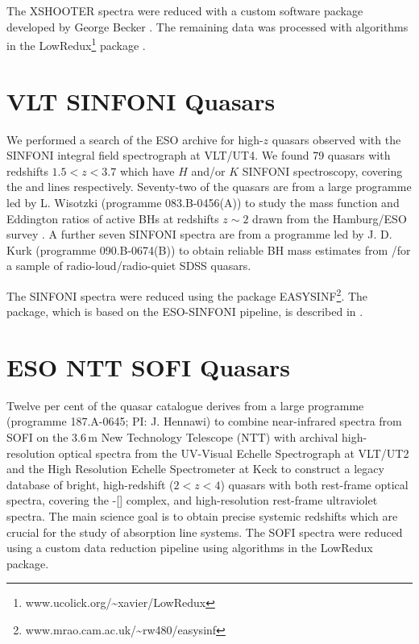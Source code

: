 The  XSHOOTER  spectra  were  reduced  with  a  custom  software  package  developed  by  George  Becker \citep[for details, see][]{lau15}. 
The remaining data was processed with algorithms in the LowRedux\footnote{www.ucolick.org/\textasciitilde xavier/LowRedux} package \citep[see][]{prochaska09}.

\section{VLT SINFONI Quasars}

We performed a search of the ESO archive for high-$z$ quasars observed with the SINFONI  integral  field  spectrograph \citep{eisenhauer03,bonnet04} at VLT/UT4.
We found 79 quasars with redshifts $1.5 < z < 3.7$ which have $H$ and/or $K$ SINFONI spectroscopy, covering the \hb and \ha lines respectively. 
Seventy-two of the quasars are from a large programme led by L. Wisotzki (programme 083.B-0456(A)) to study the mass function and Eddington ratios of active BHs at redshifts $z\sim 2$ drawn from the Hamburg/ESO survey \citep{wisotzki00}.
A further seven SINFONI spectra are from a programme led by  J. D. Kurk (programme 090.B-0674(B)) to obtain reliable BH mass estimates from \hans/\hb for a sample of radio-loud/radio-quiet SDSS quasars.

The SINFONI spectra were reduced using the package EASYSINF\footnote{www.mrao.cam.ac.uk/\textasciitilde rw480/easysinf}.  
The package, which is based on the ESO-SINFONI pipeline, is described in \citet{williams16}. 

\section{ESO NTT SOFI Quasars}

Twelve per cent of the quasar catalogue derives from a large programme (programme 187.A-0645; PI: J. Hennawi) to combine near-infrared spectra from SOFI \citep{moorwood98a} on the 3.6\,m New Technology Telescope (NTT) with archival high-resolution optical spectra from the UV-Visual Echelle Spectrograph \citep[UVES;][]{dekker00} at VLT/UT2 and the High Resolution Echelle Spectrometer \citep[HIRES;][]{vogt94} at Keck to construct a legacy database of bright, high-redshift ($2 < z < 4$) quasars with both rest-frame optical spectra, covering the \hbns-[] complex, and high-resolution rest-frame ultraviolet spectra.
The main science goal is to obtain precise systemic redshifts which are crucial for the study of absorption line systems.  
The SOFI spectra were reduced using a custom data reduction pipeline using algorithms in the LowRedux package.

